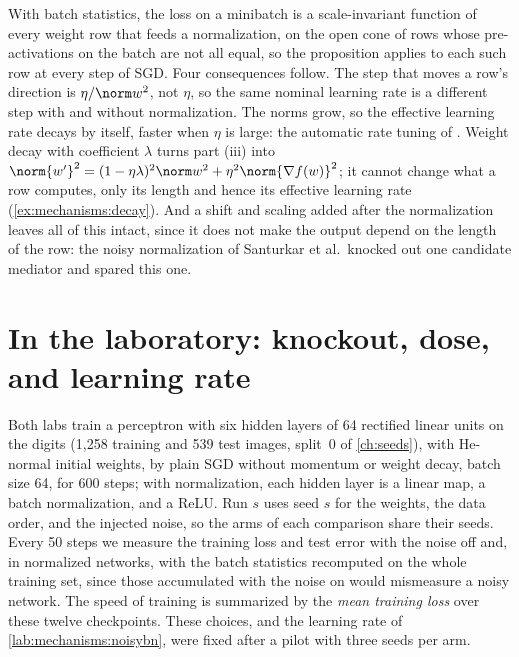 \begin{refsection}
With batch statistics, the loss on a minibatch is a scale-invariant function of every weight row that feeds a normalization, on the open cone of rows whose pre-activations on the batch are not all equal, so the proposition applies to each such row at every step of SGD. Four consequences follow. The step that moves a row's direction is $\eta/\norm w^2$, not $\eta$, so the same nominal learning rate is a different step with and without normalization. The norms grow, so the effective learning rate decays by itself, faster when $\eta$ is large: the automatic rate tuning of \textcite{AroraLiLyu2019}. Weight decay with coefficient $\lambda$ turns part (iii) into $\norm{w'}^2=(1-\eta\lambda)^2\norm w^2+\eta^2\norm{\nabla f(w)}^2$; it cannot change what a row computes, only its length and hence its effective learning rate (\cref{ex:mechanisms:decay}). And a shift and scaling added after the normalization leaves all of this intact, since it does not make the output depend on the length of the row: the noisy normalization of Santurkar et al.\ knocked out one candidate mediator and spared this one.

\section{In the laboratory: knockout, dose, and learning rate}\label{sec:mechanisms:lab}

Both labs train a perceptron with six hidden layers of 64 rectified linear units on the digits (1,258 training and 539 test images, split~0 of \cref{ch:seeds}), with He-normal initial weights, by plain SGD without momentum or weight decay, batch size 64, for 600 steps; with normalization, each hidden layer is a linear map, a batch normalization, and a ReLU. Run $s$ uses seed $s$ for the weights, the data order, and the injected noise, so the arms of each comparison share their seeds. Every 50 steps we measure the training loss and test error with the noise off and, in normalized networks, with the batch statistics recomputed on the whole training set, since those accumulated with the noise on would mismeasure a noisy network. The speed of training is summarized by the \emph{mean training loss} over these twelve checkpoints. These choices, and the learning rate of \cref{lab:mechanisms:noisybn}, were fixed after a pilot with three seeds per arm.


\end{refsection}
